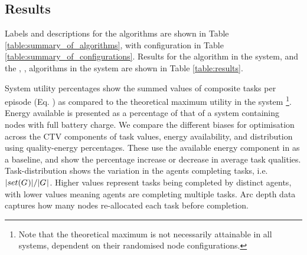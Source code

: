 \subsection{Results}
Labels and descriptions for the algorithms are shown in Table \ref{table:summary_of_algorithms}, with configuration in Table \ref{table:summary_of_configurations}. Results for the \algorithmBalanced{}{} algorithm in the \simulationSimple{}{} system, and the \algorithmEnergy{}{}, \algorithmQuality{}{}, \algorithmDistribution{}{} algorithms in the \simulationExtended{}{} system are shown in Table \ref{table:results}.

System utility percentages show the summed values of composite tasks per episode (Eq. \label{eq:system_utility}) as compared to the theoretical maximum utility in the system \footnote{Note that the theoretical maximum is not necessarily attainable in all systems, dependent on their randomised node configurations.}. Energy available is presented as a percentage of that of a system containing nodes with full battery charge. We compare the different biases for optimisation across the CTV components of task values, energy availability, and distribution using quality-energy percentages. These use the available energy component in as a baseline, and show the percentage increase or decrease in average task qualities. Task-distribution shows the variation in the agents completing tasks, i.e. $\lvert set(G_{}^{}) \rvert{}/\lvert G_{}^{} \rvert{}$. Higher values represent tasks being completed by distinct agents, with lower values meaning agents are completing multiple tasks. Arc depth data captures how many nodes re-allocated each task before completion.